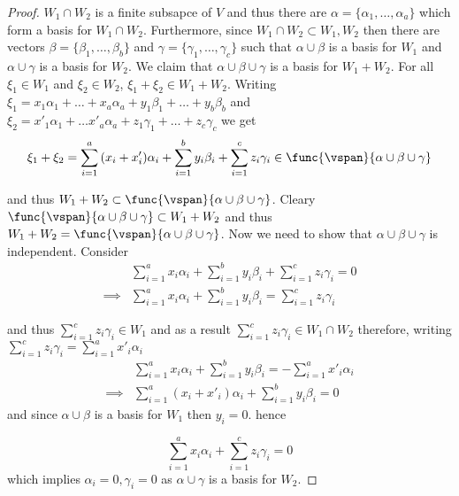 \begin{proof}
    \(W_1 \cap W_2\) is a finite subsapce of \(V\) and thus there are \( \alpha = \{\alpha_1, \dots , \alpha_a\}\) which form a basis for \(W_1 \cap W_2\). Furthermore, since \(W_1 \cap W_2 \subset W_1, W_2\) then there are vectors \(\beta = \{\beta_1 , \dots , \beta_b\}\) and \(\gamma = \{\gamma_1 , \dots , \gamma_c\}\) such that \(\alpha \cup \beta\) is a basis for \(W_1\) and \(\alpha \cup \gamma\) is a basis for \(W_2\). We claim that \(\alpha \cup \beta \cup \gamma\) is a basis for \(W_1 + W_2\). For all \(\xi_1 \in W_1\) and \(\xi_2 \in W_2\), \(\xi_1 + \xi_2 \in W_1 + W_2\). Writing \(\xi_1 = x_1 \alpha_1 + \dots + x_a \alpha_a + y_1 \beta_1 + \dots + y_b \beta_b\) and \(\xi_2 = x'_1 \alpha_1 + \dots x'_a \alpha_a + z_1 \gamma_1 + \dots + z_c \gamma_c\) we get
    \begin{equation*}
        \xi_1 + \xi_2 = \sum_{i = 1}^{a} {(x_i + x'_i)\alpha_i} +  \sum_{i = 1}^{b} {y_i \beta_i } +  \sum_{i = 1}^{c} {z_i \gamma_i} \in \func{\vspan}{\alpha \cup \beta \cup \gamma}
    \end{equation*}

    and thus \(W_1 + W_2 \subset \func{\vspan}{\alpha \cup \beta \cup \gamma}\). Cleary \(\func{\vspan}{\alpha \cup \beta \cup \gamma} \subset W_1 + W_2\) and thus \(W_1 + W_2 = \func{\vspan}{\alpha \cup \beta \cup \gamma}\). Now we need to show that \(\alpha \cup \beta \cup \gamma\) is independent. Consider
    \begin{align*}
                 & \sum_{i = 1}^{a} {x_i \alpha_i} +  \sum_{i = 1}^{b} {y_i \beta_i } +  \sum_{i = 1}^{c} {z_i \gamma_i}  = 0 \\
        \implies & \sum_{i = 1}^{a} {x_i \alpha_i} +  \sum_{i = 1}^{b} {y_i \beta_i } = \sum_{i = 1}^{c} {z_i \gamma_i}
    \end{align*}

    and thus \(\sum_{i = 1}^{c} {z_i \gamma_i} \in W_1\) and as a result \(\sum_{i = 1}^{c} {z_i \gamma_i} \in W_1 \cap W_2\) therefore, writing \(\sum_{i = 1}^{c} {z_i \gamma_i} = \sum_{i = 1}^{a} {x'_i \alpha_i}\)
    \begin{align*}
                 & \sum_{i = 1}^{a} {x_i \alpha_i} +  \sum_{i = 1}^{b} {y_i \beta_i } = -\sum_{i = 1}^{a} {x'_i \alpha_i} \\
        \implies & \sum_{i = 1}^{a} {(x_i + x'_i )\alpha_i} +  \sum_{i = 1}^{b} {y_i \beta_i } = 0
    \end{align*}
    and since \(\alpha \cup \beta\) is a basis for \(W_1\) then \(y_i = 0\). hence

    \begin{equation*}
        \sum_{i = 1}^{a} {x_i \alpha_i} + \sum_{i = 1}^{c} {z_i \gamma_i} = 0
    \end{equation*}
    which implies \(\alpha_i = 0, \gamma_i = 0\) as \(\alpha \cup \gamma\) is a basis for \(W_2\).
\end{proof}